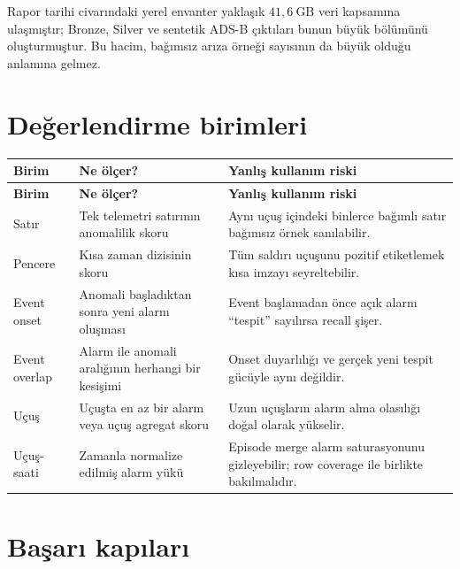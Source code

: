 \documentclass[11pt,a4paper,oneside]{report}
\begin{document}
Rapor tarihi civarındaki yerel envanter yaklaşık \(41{,}6\ \text{GB}\) veri
kapsamına ulaşmıştır; Bronze, Silver ve sentetik ADS-B çıktıları bunun büyük
bölümünü oluşturmuştur. Bu hacim, bağımsız arıza örneği sayısının da büyük
olduğu anlamına gelmez.

\section{Değerlendirme birimleri}

\begin{longtable}{L{0.17\textwidth}L{0.34\textwidth}L{0.40\textwidth}}
\toprule
\textbf{Birim} & \textbf{Ne ölçer?} & \textbf{Yanlış kullanım riski}\\
\midrule
\endfirsthead
\toprule
\textbf{Birim} & \textbf{Ne ölçer?} & \textbf{Yanlış kullanım riski}\\
\midrule
\endhead
Satır & Tek telemetri satırının anomalilik skoru & Aynı uçuş içindeki binlerce bağımlı satır bağımsız örnek sanılabilir.\\
Pencere & Kısa zaman dizisinin skoru & Tüm saldırı uçuşunu pozitif etiketlemek kısa imzayı seyreltebilir.\\
Event onset & Anomali başladıktan sonra yeni alarm oluşması & Event başlamadan önce açık alarm ``tespit'' sayılırsa recall şişer.\\
Event overlap & Alarm ile anomali aralığının herhangi bir kesişimi & Onset duyarlılığı ve gerçek yeni tespit gücüyle aynı değildir.\\
Uçuş & Uçuşta en az bir alarm veya uçuş agregat skoru & Uzun uçuşların alarm alma olasılığı doğal olarak yükselir.\\
Uçuş-saati & Zamanla normalize edilmiş alarm yükü & Episode merge alarm saturasyonunu gizleyebilir; row coverage ile birlikte bakılmalıdır.\\
\bottomrule
\end{longtable}

\section{Başarı kapıları}
\end{document}
